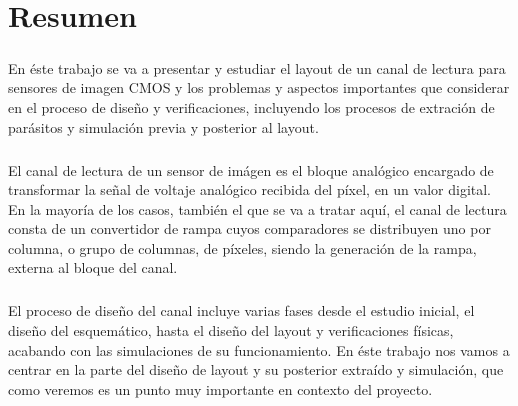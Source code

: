 \chapter{Resumen}\label{cap:resumen}

\paragraph{}
En éste trabajo se va a presentar y estudiar el layout de un canal de lectura
para sensores de imagen CMOS y los problemas y aspectos importantes que considerar
en el proceso de diseño y verificaciones, incluyendo los procesos de extración de
parásitos y simulación previa y posterior al layout.

\paragraph{}
El canal de lectura de un sensor de imágen es el bloque analógico encargado de
transformar la señal de voltaje analógico recibida del píxel, en un valor digital.
En la mayoría de los casos, también el que se va a tratar aquí, el canal de lectura
consta de un convertidor de rampa cuyos comparadores se distribuyen uno por
columna, o grupo de columnas, de píxeles, siendo la generación de la rampa, externa
al bloque del canal.

\paragraph{}
El proceso de diseño del canal incluye varias fases desde el estudio inicial, el diseño
del esquemático, hasta el diseño del layout y verificaciones físicas, acabando con
las simulaciones de su funcionamiento. En éste trabajo nos vamos a centrar en la
parte del diseño de layout y su posterior extraído y simulación, que como veremos
es un punto muy importante en contexto del proyecto.

